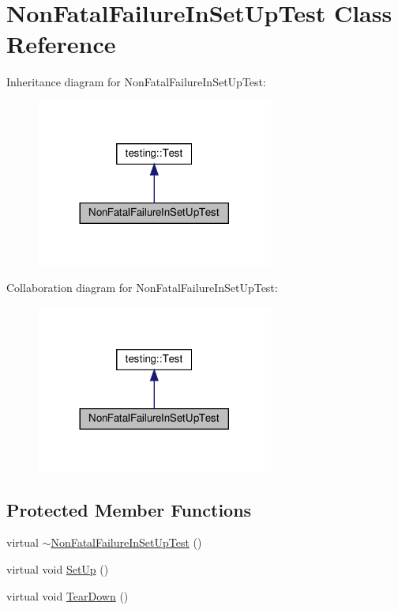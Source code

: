 \hypertarget{class_non_fatal_failure_in_set_up_test}{}\section{Non\+Fatal\+Failure\+In\+Set\+Up\+Test Class Reference}
\label{class_non_fatal_failure_in_set_up_test}


Inheritance diagram for Non\+Fatal\+Failure\+In\+Set\+Up\+Test\+:
\nopagebreak
\begin{figure}[H]
\begin{center}
\leavevmode
\includegraphics[width=221pt]{class_non_fatal_failure_in_set_up_test__inherit__graph}
\end{center}
\end{figure}


Collaboration diagram for Non\+Fatal\+Failure\+In\+Set\+Up\+Test\+:
\nopagebreak
\begin{figure}[H]
\begin{center}
\leavevmode
\includegraphics[width=221pt]{class_non_fatal_failure_in_set_up_test__coll__graph}
\end{center}
\end{figure}
\subsection*{Protected Member Functions}
\begin{DoxyCompactItemize}
\item 
virtual \hyperlink{class_non_fatal_failure_in_set_up_test_ae4b4ee1812e3427cf82b155256547442}{$\sim$\+Non\+Fatal\+Failure\+In\+Set\+Up\+Test} ()
\item 
virtual void \hyperlink{class_non_fatal_failure_in_set_up_test_ae24c724bae1fcd2601f58fa9c26adca3}{Set\+Up} ()
\item 
virtual void \hyperlink{class_non_fatal_failure_in_set_up_test_a36abc808b11afc6a9bfa20dac5c28c30}{Tear\+Down} ()
\end{DoxyCompactItemize}
